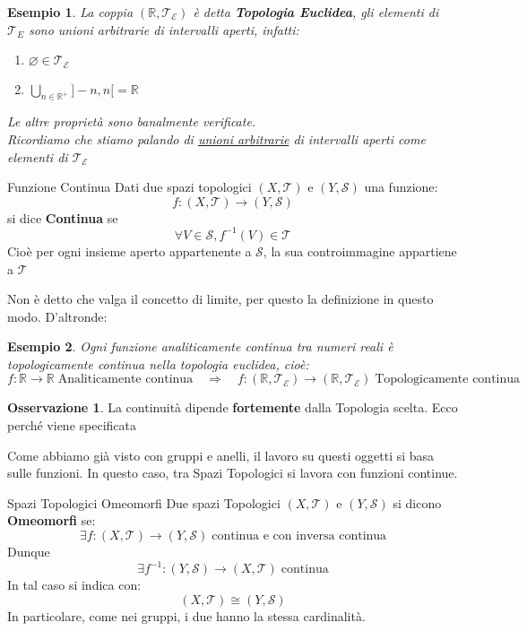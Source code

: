 \documentclass[11pt,a4paper,twoside]{article}
\newtheorem{es}{Esempio}
\theoremstyle{definition}
\newtheorem*{oss}{Osservazione}
\begin{document}
\begin{es}
	La coppia $(\mathbb R, \mathcal T_\mathcal E)$ è detta \textbf{Topologia Euclidea}, gli elementi di $\mathcal T_E$ sono unioni arbitrarie di intervalli aperti, infatti:
	\begin{enumerate}
		\item $\varnothing \in \mathcal T_\mathcal E$
		\item $\displaystyle{\bigcup_{n\in \mathbb R^+} ]-n, n[ = \mathbb R}$
	\end{enumerate}
	Le altre proprietà sono banalmente verificate.\\
	Ricordiamo che stiamo palando di \underline{unioni arbitrarie} di intervalli aperti come elementi di $\mathcal T_\mathcal E$
\end{es}

\begin{defn}{Funzione Continua}{}
	Dati due spazi topologici $(X, \mathcal T)$ e $(Y, \mathcal S)$ una funzione:
	\[ f \colon (X, \mathcal T) \rightarrow (Y, \mathcal S) \]
	si dice \textbf{Continua} se \[ \forall V \in \mathcal S, f^{-1}(V) \in \mathcal T\]
	Cioè per ogni insieme aperto appartenente a $\mathcal S$, la sua controimmagine appartiene a $\mathcal T$
\end{defn}

Non è detto che valga il concetto di limite, per questo la definizione in questo modo. D'altronde:

\begin{es}
	Ogni funzione analiticamente continua tra numeri reali è topologicamente continua nella topologia euclidea, cioè:
	\[
		f \colon \mathbb R \rightarrow \mathbb R \; \text{Analiticamente continua} \quad \Rightarrow \quad f:(\mathbb R, \mathcal T_\mathcal E) \rightarrow (\mathbb R, \mathcal T_\mathcal E) \; \text{Topologicamente continua}
	\]
\end{es}

\begin{oss}
	La continuità dipende \textbf{fortemente} dalla Topologia scelta. Ecco perché viene specificata
\end{oss}

Come abbiamo già visto con gruppi e anelli, il lavoro su questi oggetti si basa sulle funzioni. In questo caso, tra Spazi Topologici si lavora con funzioni continue.

\begin{defn}{Spazi Topologici Omeomorfi}{}
	Due spazi Topologici $(X, \mathcal T)$ e $(Y, \mathcal S)$ si dicono \textbf{Omeomorfi} se:
	\[
		\exists f \colon (X, \mathcal T) \rightarrow (Y, \mathcal S) \; \text{continua e con inversa continua}
	\]
	Dunque
	\[
		\exists f^{-1} \colon (Y, \mathcal S) \rightarrow (X, \mathcal T) \;\text{continua}
	\]
	In tal caso si indica con:
	\[ (X, \mathcal T) \cong (Y, \mathcal S) \]
	In particolare, come nei gruppi, i due hanno la stessa cardinalità.
\end{defn}
\end{document}
